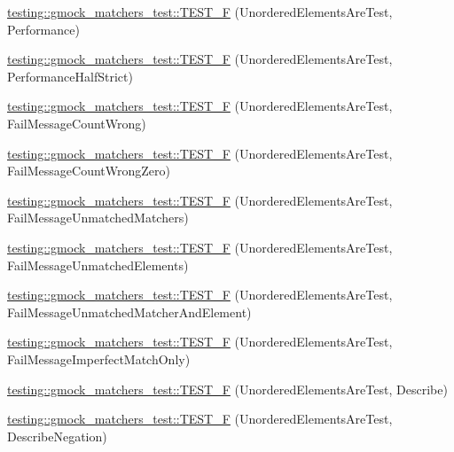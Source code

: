 \begin{DoxyCompactItemize}
\item 
\hyperlink{namespacetesting_1_1gmock__matchers__test_a074ca2babea203d1a54d69ff1fde5c59}{testing\+::gmock\+\_\+matchers\+\_\+test\+::\+T\+E\+S\+T\+\_\+F} (Unordered\+Elements\+Are\+Test, Performance)
\item 
\hyperlink{namespacetesting_1_1gmock__matchers__test_a4437de9d40efd87f73b738ef38c2d70f}{testing\+::gmock\+\_\+matchers\+\_\+test\+::\+T\+E\+S\+T\+\_\+F} (Unordered\+Elements\+Are\+Test, Performance\+Half\+Strict)
\item 
\hyperlink{namespacetesting_1_1gmock__matchers__test_a5dd3b28b540c1ef01e623f840c48e7b4}{testing\+::gmock\+\_\+matchers\+\_\+test\+::\+T\+E\+S\+T\+\_\+F} (Unordered\+Elements\+Are\+Test, Fail\+Message\+Count\+Wrong)
\item 
\hyperlink{namespacetesting_1_1gmock__matchers__test_a7dc8c467fe0d6f26c0ee643be56eb590}{testing\+::gmock\+\_\+matchers\+\_\+test\+::\+T\+E\+S\+T\+\_\+F} (Unordered\+Elements\+Are\+Test, Fail\+Message\+Count\+Wrong\+Zero)
\item 
\hyperlink{namespacetesting_1_1gmock__matchers__test_a11b785087491ae58b074fa8dbbc88cd4}{testing\+::gmock\+\_\+matchers\+\_\+test\+::\+T\+E\+S\+T\+\_\+F} (Unordered\+Elements\+Are\+Test, Fail\+Message\+Unmatched\+Matchers)
\item 
\hyperlink{namespacetesting_1_1gmock__matchers__test_a6dfb50dcbb543de71fcc4d09844d36b3}{testing\+::gmock\+\_\+matchers\+\_\+test\+::\+T\+E\+S\+T\+\_\+F} (Unordered\+Elements\+Are\+Test, Fail\+Message\+Unmatched\+Elements)
\item 
\hyperlink{namespacetesting_1_1gmock__matchers__test_a2395b7e71b7ad50af72caa61c10e6898}{testing\+::gmock\+\_\+matchers\+\_\+test\+::\+T\+E\+S\+T\+\_\+F} (Unordered\+Elements\+Are\+Test, Fail\+Message\+Unmatched\+Matcher\+And\+Element)
\item 
\hyperlink{namespacetesting_1_1gmock__matchers__test_ac70f9f9717f35352349b076654094f6a}{testing\+::gmock\+\_\+matchers\+\_\+test\+::\+T\+E\+S\+T\+\_\+F} (Unordered\+Elements\+Are\+Test, Fail\+Message\+Imperfect\+Match\+Only)
\item 
\hyperlink{namespacetesting_1_1gmock__matchers__test_a937f4d835023cd6322eb7d32596f3f43}{testing\+::gmock\+\_\+matchers\+\_\+test\+::\+T\+E\+S\+T\+\_\+F} (Unordered\+Elements\+Are\+Test, Describe)
\item 
\hyperlink{namespacetesting_1_1gmock__matchers__test_a3c4c92b68a08c5d541e46ed367e216ab}{testing\+::gmock\+\_\+matchers\+\_\+test\+::\+T\+E\+S\+T\+\_\+F} (Unordered\+Elements\+Are\+Test, Describe\+Negation)

\end{DoxyCompactItemize}
